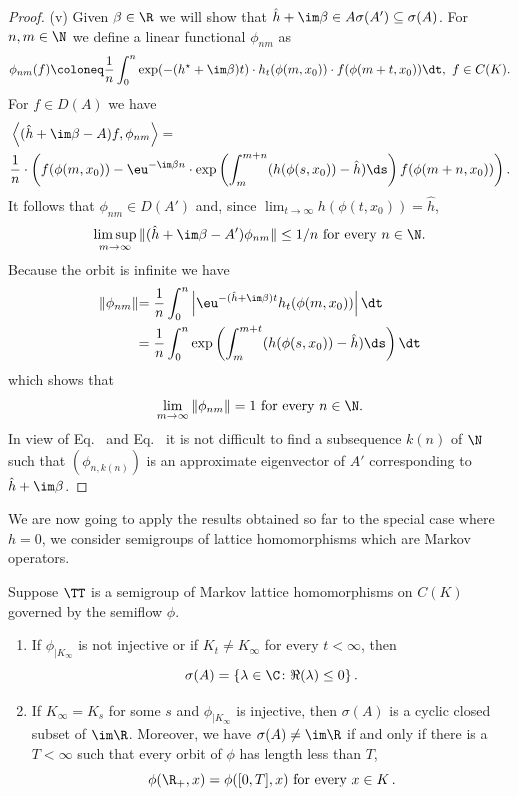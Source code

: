 \begin{proof}
    (v) Given $\beta \in \R$ we will show that $\hat{h} + \im\beta \in A\sigma(A') \subseteq \sigma(A)$.
    For $n,m \in \N$ we define a linear functional $\phi_{nm}$ as 
\[  
	\phi_{nm}(f) \coloneq \frac{1}{n}\int_{0}^{n} \exp(-(h^{\star}+\im\beta )t)\cdot h_{t}(\phi(m,x_{0}))\cdot f(\phi(m+t,x_{0})) \dt, \ f\in C(K).
\]
For $f \in D(A)$ we have 
	\begin{align*}
	&\left\langle(\hat{h}+\im\beta -A)f,\phi_{nm}\right\rangle = \\
	&  \frac{1}{n}\cdot\left(f(\phi(m,x_{0})) - \eu^{-\im\beta  n}\cdot %
	\exp\left(\int_{m}^{m+n} (h(\phi(s,x_{0}))-\hat{h})\ds \right)f(\phi(m+n,x_{0}))\right).
	\end{align*}
It follows that $\phi_{nm} \in D(A')$ and, since $\lim_{t\to\infty} h(\phi(t,x_{0})) = \hat{h}$,
\begin{equation}\label{eq:b3-4.13}
	\limsup_{m\to\infty} \|(\hat{h}+\im\beta -A')\phi_{nm}\| \leq 1/n \text{ for every } n \in \N.
\end{equation}
Because the orbit is infinite we have
	\begin{align*}
	\|\phi_{nm}\| & {= \frac{1}{n}\int_{0}^{n} \left|\eu^{-(\hat{h}+\im\beta )t} h_{t}(\phi(m,x_{0}))\right| \dt} \\
	& {= \frac{1}{n}\int_{0}^{n} \exp\left(\int_{m}^{m+t} (h(\phi(s,x_{0}))-\hat{h})\ds \right)\dt}
	\end{align*}
which shows that
\begin{equation}\label{eq:b3-4.14}
	\lim_{m\to\infty} \|\phi_{nm}\| = 1 \text{ for every } n \in \N.
\end{equation}
In view of Eq.~ and Eq.~ it is not difficult to find a subsequence $k(n)$ of\/ $\N$ such that $(\phi_{n,k(n)})$ is an approximate eigenvector of\/ $A'$ corresponding to $\hat{h} + \im\beta$.
\end{proof}
We are now going to apply the results obtained so far to the special case where $h = 0$, \ie we consider semigroups of lattice homomorphisms which are Markov operators.
\begin{theorem}\label{thm:b3-4.9}
	Suppose $\TT$ is a semigroup of Markov lattice homomorphisms on $C(K)$ governed by the semiflow $\phi$.
	\begin{enumerate}[\upshape (i)]
		\item 
		If\/ $\phi_{|K_{\infty}}$ is not injective or if\/ $K_{t} \neq K_{\infty}$ for every $t < \infty$, then \[
        \sigma(A) = \{\lambda \in \C \colon \Re(\lambda) \leq 0\}\,.
		\]
		\item 
		If\/ $K_{\infty} = K_{s}$ for some $s$ and $\phi_{|K_{\infty}}$ is injective, then $\sigma(A)$ is a cyclic closed subset of\/ $\im \R$.
		Moreover, we have $\sigma(A) \neq \im\R$ if and only if there is a $T < \infty$ such that every orbit of\/ $\phi$ has length less than $T$, \ie 
        \[
        \phi(\R_{+},x) = \phi([0,T],x) \text{ for every } x \in K\,.
        \]
	\end{enumerate}
\end{theorem}
